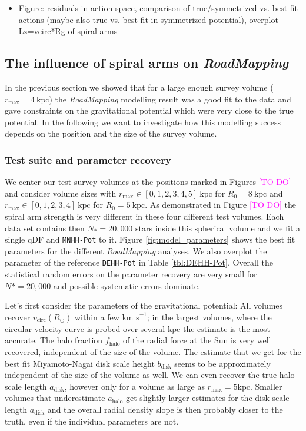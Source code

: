 \documentclass[iop,revtex4,numberedappendix,appendixfloats]{emulateapj}
\newcommand{\RM}{{\sl RoadMapping}}
\newcommand{\Wilma}[1]{\textcolor{Magenta}{#1}}
\begin{document}
\begin{itemize}
\item Figure: residuals in action space, comparison of true/symmetrized vs. best fit actions (maybe also true vs. best fit in symmetrized potential), overplot Lz=vcirc*Rg of spiral arms
\end{itemize}

\clearpage
\newpage

\subsection{The influence of spiral arms on \RM{}} \label{sec:results_part2}

In the previous section we showed that for a large enough survey volume ($r_\text{max}=4~\text{kpc}$) the \RM{} modelling result was a good fit to the data and gave constraints on the gravitational potential which were very close to the true potential. In the following we want to investigate how this modelling success depends on the position and the size of the survey volume.

\subsubsection{Test suite and parameter recovery}

We center our test survey volumes at the positions marked in Figures \Wilma{[TO DO]} and consider volume sizes with $r_\text{max} \in [0,1,2,3,4,5]~\text{kpc}$ for $R_0 = 8~\text{kpc}$ and $r_\text{max} \in [0,1,2,3,4]~\text{kpc}$ for $R_0 = 5~\text{kpc}$. As demonstrated in Figure \Wilma{[TO DO]} the spiral arm strength is very different in these four different test volumes. Each data set contains then $N_*=20,000$ stars inside this spherical volume and we fit a single qDF and \texttt{MNHH-Pot} to it. Figure \ref{fig:model_parameters} shows the best fit parameters for the different \RM{} analyses. We also overplot the parameter of the reference \texttt{DEHH-Pot} in Table \ref{tbl:DEHH-Pot}. Overall the statistical random errors on the parameter recovery are very small for $N*=20,000$ and possible systematic errors dominate. 

Let's first consider the parameters of the gravitational potential: All volumes recover $v_\text{circ}(R_\odot)$ within a few $\text{km s}^{-1}$; in the largest volumes, where the circular velocity curve is probed over several $\text{kpc}$ the estimate is the most accurate. The halo fraction $f_\text{halo}$ of the radial force at the Sun is very well recovered, independent of the size of the volume. The estimate that we get for the best fit Miyamoto-Nagai disk scale height $b_\text{disk}$ seems to be approximately independent of the size of the volume as well. We can even recover the true halo scale length $a_\text{disk}$, however only for a volume as large as $r_\text{max}=5\text{kpc}$. Smaller volumes that underestimate $a_\text{halo}$ get slightly larger estimates for the disk scale length $a_\text{disk}$ and the overall radial density slope is then probably closer to the truth, even if the individual parameters are not.
\end{document}
